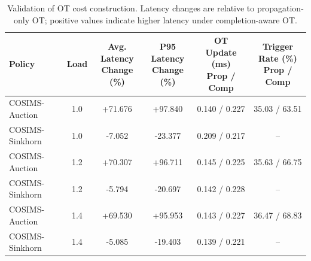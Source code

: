 \begin{table}[t]
\centering
\caption{Validation of OT cost construction. Latency changes are relative to propagation-only OT; positive values indicate higher latency under completion-aware OT.}
\label{tab:ot_cost_construction}
\small
\setlength{\tabcolsep}{2.5pt}
\renewcommand{\arraystretch}{1.05}
\begin{tabular}{lccccc}
\toprule
\textbf{Policy} & \textbf{Load} & \makecell{\textbf{Avg. Latency}\\\textbf{Change (\%)}} & \makecell{\textbf{P95 Latency}\\\textbf{Change (\%)}} & \makecell{\textbf{OT Update (ms)}\\\textbf{Prop / Comp}} & \makecell{\textbf{Trigger Rate (\%)}\\\textbf{Prop / Comp}} \\
\midrule
COSIMS-Auction & 1.0 & +71.676 & +97.840 & 0.140 / 0.227 & 35.03 / 63.51 \\
COSIMS-Sinkhorn & 1.0 & -7.052 & -23.377 & 0.209 / 0.217 & -- \\
COSIMS-Auction & 1.2 & +70.307 & +96.711 & 0.145 / 0.225 & 35.63 / 66.75 \\
COSIMS-Sinkhorn & 1.2 & -5.794 & -20.697 & 0.142 / 0.228 & -- \\
COSIMS-Auction & 1.4 & +69.530 & +95.953 & 0.143 / 0.227 & 36.47 / 68.83 \\
COSIMS-Sinkhorn & 1.4 & -5.085 & -19.403 & 0.139 / 0.221 & -- \\
\bottomrule
\end{tabular}
\end{table}
